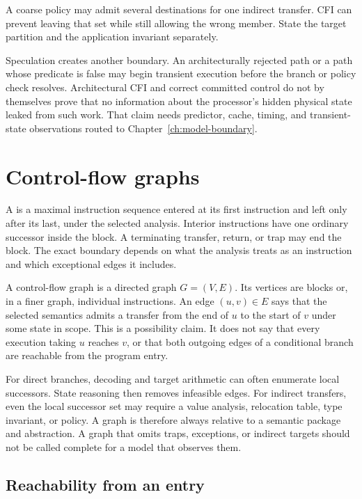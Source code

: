 \begin{warning}[title={Allowed control is not necessarily intended control}]
A coarse policy may admit several destinations for one indirect transfer. CFI
can prevent leaving that set while still allowing the wrong member. State the
target partition and the application invariant separately.
\end{warning}

Speculation creates another boundary. An architecturally rejected path or a
path whose predicate is false may begin transient execution before the branch
or policy check resolves.
Architectural CFI and correct committed control do not by themselves prove
that no information about the processor's hidden physical state leaked from
such work. That claim needs
predictor, cache, timing, and transient-state observations routed to
Chapter~\ref{ch:model-boundary}.

\section{Control-flow graphs}

A  is a maximal instruction sequence entered at its first
instruction and left only after its last, under the selected analysis. Interior
instructions have one ordinary successor inside the block. A terminating
transfer, return, or trap may end the block. The exact boundary depends on what
the analysis treats as an instruction and which exceptional edges it includes.

A control-flow graph is a directed graph \(G=(V,E)\). Its vertices are blocks
or, in a finer graph, individual instructions. An edge \((u,v)\in E\) says
that the selected semantics admits a transfer from the end of \(u\) to the
start of \(v\) under some state in scope. This is a possibility claim. It does
not say that every execution taking \(u\) reaches \(v\), or that both outgoing
edges of a conditional branch are reachable from the program entry.

For direct branches, decoding and target arithmetic can often enumerate local
successors. State reasoning then removes infeasible edges. For indirect
transfers, even the local successor set may require a value analysis,
relocation table, type invariant, or policy. A graph is therefore always
relative to a semantic package and abstraction. A graph that omits traps,
exceptions, or indirect targets should not be called complete for a model that
observes them.

\subsection{Reachability from an entry}

